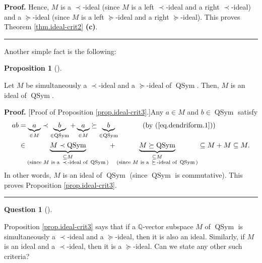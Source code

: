 \documentclass[numbers=enddot,12pt,final,onecolumn,notitlepage]{scrartcl}%
\theoremstyle{definition}
\newtheorem{prop}[theo]{Proposition}
\newenvironment{proposition}[1][]
{\begin{prop}[#1]\begin{leftbar}}
{\end{leftbar}\end{prop}}
\newtheorem{quest}[theo]{Question}
\newenvironment{question}[1][]
{\begin{quest}[#1]\begin{leftbar}}
{\end{leftbar}\end{quest}}
\newenvironment{proof}[1][Proof]{\noindent\textbf{#1.} }{\ \rule{0.5em}{0.5em}}
\newenvironment{question}[1][Question]{\noindent\textbf{#1.} }{\ \rule{0.5em}{0.5em}}
\newenvironment{verlong}{}{}
\begin{document}
\begin{verlong}
\begin{proof}
Hence, $M$ is a $\left.  \prec\right.  $-ideal (since $M$ is a left $\left.
\prec\right.  $-ideal and a right $\left.  \prec\right.  $-ideal) and a
$\left.  \succeq\right.  $-ideal (since $M$ is a left $\left.  \succeq\right.
$-ideal and a right $\left.  \succeq\right.  $-ideal). This proves Theorem
\ref{thm.ideal-crit2} \textbf{(c)}.
\end{proof}

Another simple fact is the following:

\begin{proposition}
\label{prop.ideal-crit3}Let $M$ be simultaneously a $\left.  \prec\right.
$-ideal and a $\left.  \succeq\right.  $-ideal of $\operatorname*{QSym}$.
Then, $M$ is an ideal of $\operatorname*{QSym}$.
\end{proposition}

\begin{proof}
[Proof of Proposition \ref{prop.ideal-crit3}.]Any $a\in M$ and $b\in
\operatorname*{QSym}$ satisfy%
\begin{align*}
ab  &  =\underbrace{a}_{\in M}\left.  \prec\right.  \underbrace{b}%
_{\in\operatorname*{QSym}}+\underbrace{a}_{\in M}\left.  \succeq\right.
\underbrace{b}_{\in\operatorname*{QSym}}\ \ \ \ \ \ \ \ \ \ \left(  \text{by
(\ref{eq.dendriform.1})}\right) \\
&  \in\underbrace{M\left.  \prec\right.  \operatorname*{QSym}}%
_{\substack{\subseteq M\\\text{(since }M\text{ is a }\left.  \prec\right.
\text{-ideal of }\operatorname*{QSym}\text{)}}}+\underbrace{M\left.
\succeq\right.  \operatorname*{QSym}}_{\substack{\subseteq M\\\text{(since
}M\text{ is a }\left.  \succeq\right.  \text{-ideal of }\operatorname*{QSym}%
\text{)}}}\subseteq M+M\subseteq M.
\end{align*}
In other words, $M$ is an ideal of $\operatorname*{QSym}$
(since $\operatorname*{QSym}$ is commutative). This proves
Proposition \ref{prop.ideal-crit3}.
\end{proof}

\begin{question}
Proposition \ref{prop.ideal-crit3} says that if a $\mathbb{Q}$-vector subspace
$M$ of $\operatorname*{QSym}$ is simultaneously a $\left.  \prec\right.
$-ideal and a $\left.  \succeq\right.  $-ideal, then it is also an ideal.
Similarly, if $M$ is an ideal and a $\left.  \prec\right.  $-ideal, then it is
a $\left.  \succeq\right.  $-ideal. Can we state any other such criteria?
\end{question}


\end{verlong}
\end{document}
